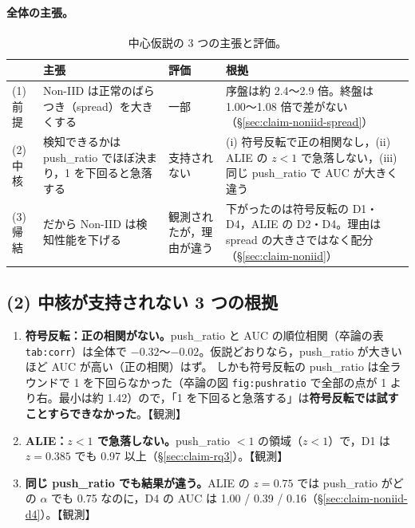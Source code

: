 \documentclass[a4j, dvipdfmx]{jsarticle}  %
\begin{document}
\paragraph{全体の主張。}
\begin{table}[H]
\centering
\caption{中心仮説の 3 つの主張と評価。}
\label{tab:hyp4-eval}
\small
\begin{tabular}{@{}P{1.4cm} P{5.0cm} P{2.2cm} P{6.6cm}@{}}
\toprule
 & 主張 & 評価 & 根拠 \\
\midrule
(1) 前提 & Non-IID は正常のばらつき（spread）を大きくする & 一部 & 序盤は約 2.4〜2.9 倍。終盤は 1.00〜1.08 倍で差がない（\S\ref{sec:claim-noniid-spread}） \\
(2) 中核 & 検知できるかは push\_ratio でほぼ決まり，1 を下回ると急落する & 支持されない & (i) 符号反転で正の相関なし，(ii) ALIE の $z < 1$ で急落しない，(iii) 同じ push\_ratio で AUC が大きく違う \\
(3) 帰結 & だから Non-IID は検知性能を下げる & 観測されたが，理由が違う & 下がったのは符号反転の D1・D4，ALIE の D2・D4。理由は spread の大きさではなく配分（\S\ref{sec:claim-noniid}） \\
\bottomrule
\end{tabular}
\end{table}

\subsection{(2) 中核が支持されない 3 つの根拠}
\label{sec:claim-hyp4-core}

\begin{enumerate}
  \item \textbf{符号反転：正の相関がない。}push\_ratio と AUC の順位相関（卒論の表 \texttt{tab:corr}）は全体で $-0.32$〜$-0.02$。仮説どおりなら，push\_ratio が大きいほど AUC が高い（正の相関）はず。
        しかも符号反転の push\_ratio は全ラウンドで 1 を下回らなかった（卒論の図 \texttt{fig:pushratio} で全部の点が 1 より右。最小は約 1.42）ので，「1 を下回ると急落する」は\textbf{符号反転では試すことすらできなかった}。【観測】
  \item \textbf{ALIE：$z < 1$ で急落しない。}push\_ratio $< 1$ の領域（$z < 1$）で，D1 は $z = 0.385$ でも 0.97 以上（\S\ref{sec:claim-rq3}）。【観測】
  \item \textbf{同じ push\_ratio でも結果が違う。}ALIE の $z = 0.75$ では push\_ratio がどの $\alpha$ でも 0.75 なのに，D4 の AUC は 1.00 / 0.39 / 0.16（\S\ref{sec:claim-noniid-d4}）。【観測】
\end{enumerate}
\end{document}
